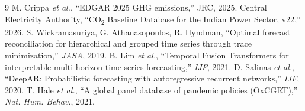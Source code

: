 \documentclass[conference]{IEEEtran}
\begin{document}

\begin{thebibliography}{9}
 M. Crippa \emph{et al.}, ``EDGAR 2025 GHG emissions,'' JRC, 2025.
 Central Electricity Authority, ``CO\textsubscript{2} Baseline Database for the Indian Power Sector, v22,'' 2026.
 S. Wickramasuriya, G. Athanasopoulos, R. Hyndman, ``Optimal forecast reconciliation for hierarchical and grouped time series through trace minimization,'' \emph{JASA}, 2019.
 B. Lim \emph{et al.}, ``Temporal Fusion Transformers for interpretable multi-horizon time series forecasting,'' \emph{IJF}, 2021.
 D. Salinas \emph{et al.}, ``DeepAR: Probabilistic forecasting with autoregressive recurrent networks,'' \emph{IJF}, 2020.
 T. Hale \emph{et al.}, ``A global panel database of pandemic policies (OxCGRT),'' \emph{Nat. Hum. Behav.}, 2021.
\end{thebibliography}
\end{document}

